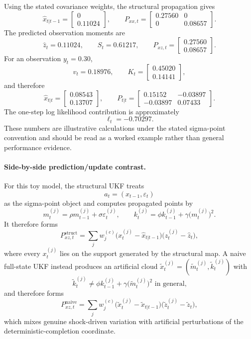 Using the stated covariance weights, the structural
propagation gives
\[
  \hat x_{t|t-1}
  =
  \begin{bmatrix}
    0\\ 0.11024
  \end{bmatrix},
  \qquad
  P_{xx,t}
  =
  \begin{bmatrix}
    0.27560 & 0\\
    0 & 0.08657
  \end{bmatrix}.
\]
The predicted observation moments are
\[
  \hat z_t=0.11024,\qquad S_t=0.61217,\qquad
  P_{xz,t}=
  \begin{bmatrix}
    0.27560\\ 0.08657
  \end{bmatrix}.
\]
For an observation $y_t=0.30$,
\[
  v_t=0.18976,\qquad
  K_t=
  \begin{bmatrix}
    0.45020\\ 0.14141
  \end{bmatrix},
\]
and therefore
\[
  \hat x_{t|t}
  =
  \begin{bmatrix}
    0.08543\\ 0.13707
  \end{bmatrix},
  \qquad
  P_{t|t}
  =
  \begin{bmatrix}
    0.15152 & -0.03897\\
    -0.03897 & 0.07433
  \end{bmatrix}.
\]
The one-step log likelihood contribution is approximately
\[
  \ell_t=-0.70297.
\]
These numbers are illustrative calculations under the stated sigma-point
convention and should be read as a worked example rather than general
performance evidence.

\paragraph{Side-by-side prediction/update contrast.}
For this toy model, the structural UKF treats
\[
  a_t=(x_{t-1},\varepsilon_t)
\]
as the sigma-point object and computes propagated points by
\[
  m_t^{(j)} = \rho m_{t-1}^{(j)} + \sigma \varepsilon_t^{(j)},
  \qquad
  k_t^{(j)} = \phi k_{t-1}^{(j)} + \gamma \bigl(m_t^{(j)}\bigr)^2.
\]
It therefore forms
\[
  P_{xz,t}^{\mathrm{struct}}
  =
  \sum_j w_j^{(c)}
  \bigl(x_t^{(j)}-\hat x_{t|t-1}\bigr)
  \bigl(z_t^{(j)}-\hat z_t\bigr),
\]
where every $x_t^{(j)}$ lies on the support generated by the structural map.
A naive full-state UKF instead produces an artificial cloud
$\tilde x_t^{(j)}=(\tilde m_t^{(j)},\tilde k_t^{(j)})$ with
\[
  \tilde k_t^{(j)} \neq \phi k_{t-1}^{(j)} + \gamma \bigl(\tilde m_t^{(j)}\bigr)^2
  \text{ in general,}
\]
and therefore forms
\[
  P_{xz,t}^{\mathrm{naive}}
  =
  \sum_j w_j^{(c)}
  \bigl(\tilde x_t^{(j)}-\tilde x_{t|t-1}\bigr)
  \bigl(\tilde z_t^{(j)}-\tilde z_t\bigr),
\]
which mixes genuine shock-driven variation with artificial perturbations of the
deterministic-completion coordinate.

